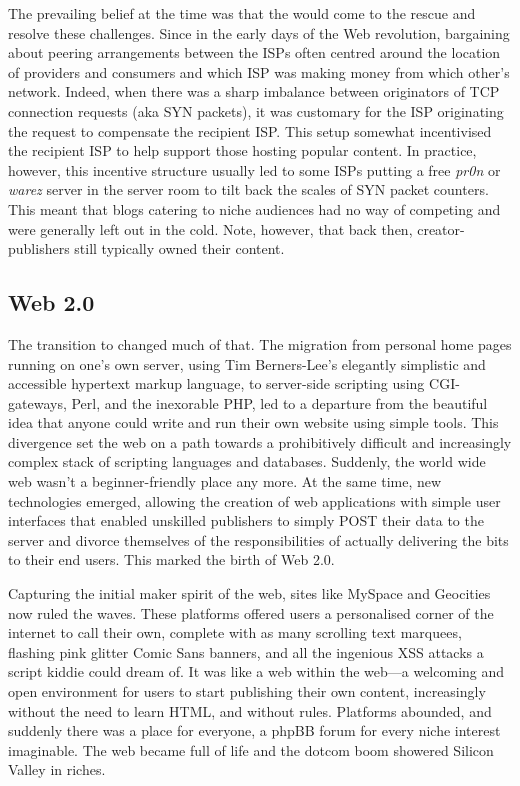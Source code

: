 The prevailing belief at the time was that the  would come to the rescue and resolve these challenges. Since in the early days of the Web revolution, bargaining about peering arrangements between the ISPs often centred around the location of providers and consumers and which ISP was making money from which other's network. Indeed, when there was a sharp imbalance between originators of TCP connection requests (aka SYN packets), it was customary for the  ISP originating the request to compensate the recipient ISP. This setup somewhat incentivised the recipient ISP to help support those hosting popular content. In practice, however, this incentive structure usually led to some ISPs putting a free \emph{pr0n} or \emph{warez} server in the server room to tilt back the scales of SYN packet counters. This meant that blogs catering to niche audiences had no way of competing and were generally left out in the cold. Note, however, that back then, creator-publishers still typically owned their content.

\subsection{Web 2.0 \statusgreen}\label{sec:web_2}

The transition to  changed much of that. The migration from personal home pages running on one's own server, using Tim Berners-Lee's elegantly simplistic and accessible hypertext markup language, to server-side scripting using CGI-gateways, Perl, and the inexorable PHP, led to a departure from the beautiful idea that anyone could write and run their own website using simple tools. This divergence set the web on a path towards a prohibitively difficult and increasingly complex stack of scripting languages and databases. Suddenly, the world wide web wasn't a beginner-friendly place any more. At the same time, new technologies emerged, allowing the creation of web applications with simple user interfaces that enabled unskilled publishers to simply POST their data to the server and divorce themselves of the responsibilities of actually delivering the bits to their end users. This marked the birth of Web 2.0.

Capturing the initial maker spirit of the web, sites like MySpace and Geocities now ruled the waves. These platforms offered users a personalised corner of the internet to call their own, complete with as many scrolling text marquees, flashing pink glitter Comic Sans banners, and all the ingenious XSS attacks a script kiddie could dream of. It was like a web within the web---a welcoming and open environment for users to start publishing their own content, increasingly without the need to learn HTML, and without rules. Platforms abounded, and suddenly there was a place for everyone, a phpBB forum for every niche interest imaginable. The web became full of life and the dotcom boom showered Silicon Valley in riches.

